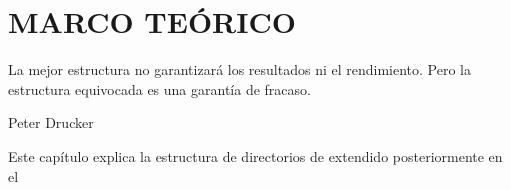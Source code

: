 \chapter{MARCO TE\'ORICO}
\label{cap2}

\begin{FraseCelebre}
  \begin{Frase}
    La mejor estructura no garantizará los resultados ni el rendimiento.
    Pero la estructura equivocada es una garantía de fracaso.
  \end{Frase}
\begin{Fuente}
Peter Drucker
\end{Fuente}
\end{FraseCelebre}

\begin{resumen}
  Este capítulo explica la estructura de directorios de extendido posteriormente en el
\end{resumen}











